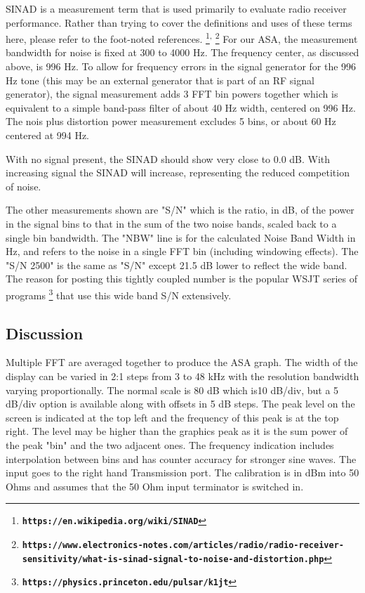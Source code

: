 SINAD is a measurement term that is used primarily to evaluate radio receiver performance.  Rather than trying to cover the definitions and uses of these terms here, please refer to the foot-noted references.
%
\footnote {\textbf{\texttt{https://en.wikipedia.org/wiki/SINAD}}}\textsuperscript{,}
%
\footnote{\textbf{\texttt{https://www.electronics-notes.com/articles/radio/radio-receiver-sensitivity/what-is-sinad-signal-to-noise-and-distortion.php}}}
%
For our ASA, the measurement bandwidth for noise is fixed at 300 to 4000 Hz.  The frequency center, as discussed above, is 996 Hz.  To allow for frequency errors in the signal generator for the 996 Hz tone (this may be an external generator that is part of an RF signal generator), the signal measurement adds 3 FFT bin powers together which is equivalent to a simple band-pass filter of about 40 Hz width, centered on 996 Hz.  The nois plus distortion power measurement excludes 5 bins, or about 60 Hz centered at 994 Hz.

With no signal present, the SINAD should show very close to 0.0 dB.  With increasing signal the SINAD will increase, representing the reduced competition of noise. 

The other measurements shown are "S/N" which is the ratio, in dB, of the power in the signal bins to that in the sum of the two noise bands, scaled back to a single bin bandwidth.   The "NBW"  line is for the calculated Noise Band Width in Hz, and refers to the noise in a single FFT bin (including windowing effects).   The "S/N 2500" is the same as "S/N" except 21.5 dB lower to reflect the wide band.  The reason for posting this tightly coupled number is the popular WSJT series of programs
%
\footnote{\textbf{\texttt{https://physics.princeton.edu/pulsar/k1jt}}}
%
that use this wide band S/N extensively.

\subsection{Discussion}
\label{subsect:ASADiscus}
Multiple FFT are averaged together to produce the ASA graph.  The width of the display can be varied in 2:1 steps from 3 to 48 kHz with the resolution bandwidth varying proportionally.  The normal scale is 80 dB which is10 dB/div, but a 5 dB/div option is available along with offsets in 5 dB steps.  The peak level on the screen is indicated at the top left and the frequency of this peak is at the top right.  The level may be higher than the graphics peak as it is the sum power of the peak "bin" and the two adjacent ones.  The frequency indication includes interpolation between bins and has counter accuracy for stronger sine waves.  The input goes to the right hand Transmission port.  The calibration is in dBm into 50 Ohms and assumes that the 50 Ohm input terminator is switched in.
